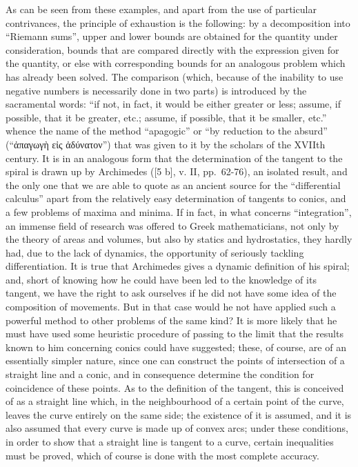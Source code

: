 As can be seen from these examples, and apart from the use of particular contrivances, the principle of exhaustion is the following: by a decomposition into ``Riemann sums'', upper and lower bounds are obtained for the quantity under consideration, bounds that are compared directly with the expression given for the quantity, or else with corresponding bounds for an analogous problem which has already been solved. The comparison (which, because of the inability to use negative numbers is necessarily done in two parts) is introduced by the sacramental words: ``if not, in fact, it would be either greater or less; assume, if possible, that it be greater, etc.; assume, if possible, that it be smaller, etc.'' whence the name of the method ``apagogic'' or ``by reduction to the absurd'' (``ἀπαγωγὴ εἰς ἀδύνατον'') that was given to it by the scholars of the XVIIth century. It is in an analogous form that the determination of the tangent to the spiral is drawn up by Archimedes ({[}5 b{]}, v. II, pp.~62-76), an isolated result, and the only one that we are able to quote as an ancient source for the ``differential calculus'' apart from the relatively easy determination of tangents to conics, and a few problems of maxima and minima. If in fact, in what concerns ``integration'', an immense field of research was offered to Greek mathematicians, not only by the theory of areas and volumes, but also by statics and hydrostatics, they hardly had, due to the lack of dynamics, the opportunity of seriously tackling differentiation. It is true that Archimedes gives a dynamic definition of his spiral; and, short of knowing how he could have been led to the knowledge of its tangent, we have the right to ask ourselves if he did not have some idea of the composition of movements. But in that case would he not have applied such a powerful method to other problems of the same kind? It is more likely that he must have used some heuristic procedure of passing to the limit that the results known to him concerning conics could have suggested; these, of course, are of an essentially simpler nature, since one can construct the points of intersection of a straight line and a conic, and in consequence determine the condition for coincidence of these points. As to the definition of the tangent, this is conceived of as a straight line which, in the neighbourhood of a certain point of the curve, leaves the curve entirely on the same side; the existence of it is assumed, and it is also assumed that every curve is made up of convex arcs; under these conditions, in order to show that a straight line is tangent to a curve, certain inequalities must be proved, which of course is done with the most complete accuracy.

